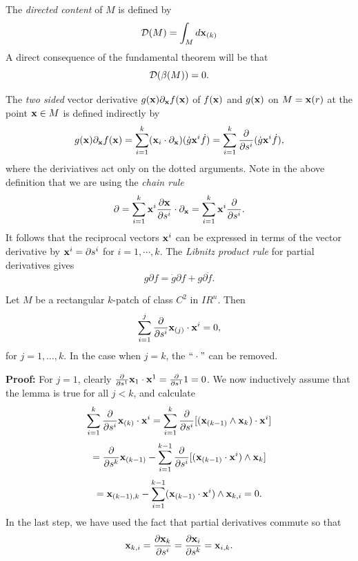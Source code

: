 \documentclass[12]{article}
\def\no{\noindent}
\def\bx{{\bf x}}
\def\R{I\!\!R}
\def\w{\wedge}
\def\no{\noindent}
\def\no{\noindent}
\def\no{\noindent}
\def\d{\partial}
\def \xx {{\bf x}}
\begin{document}
\bigskip

The {\it directed content} of $M$ is defined by
\begin{displaymath}
{\cal D}(M)=\int_{M}d\xx_{(k)}
\end{displaymath}
A direct consequence of the fundamental theorem will be that
\begin{displaymath}
{\cal D}(\beta(M))=0.
\end{displaymath}

The {\it two sided} vector derivative $g(\bx)\d_\bx f(\bx)$  of $f(\bx)$ and $g(\bx)$ on $M=\bx(r)$
 at the point $\bx\in M$ is defined indirectly by
\begin{equation}
g(\bx)\d_\bx f(\bx) 
=\sum_{i=1}^k(\xx_i \cdot \d_\bx)(\dot g \xx^i \dot f)=\sum_{i=1}^k\frac{\partial}{\partial s^i}(\dot g \xx^i \dot f),
\end{equation}
where the deriviatives act only on the dotted arguments.
 Note in the above definition that we are using the {\it chain rule} 
  \[  \partial = \sum_{i=1}^k \xx^i \frac{\partial \bx}{\partial s^i}\cdot
    \partial_\bx = \sum_{i=1}^k \xx^i \frac{\partial}{\partial s^i}
   . \]
It follows that the reciprocal vectors $\xx^i$ can be expressed in
terms of the vector derivative by $\xx^i=\partial s^i$ for
$i=1, \cdots, k$. The {\it Libnitz product rule} for partial derivatives gives 
\begin{displaymath}
g\d f=\dot g \d f+ g \d \dot f.
\end{displaymath}

\bigskip

\no {\bf Lemma:} Let $M$ be a rectangular $k$-patch of class $C^2$ in $\R^n$. Then 
   $$\sum_{i=1}^j \frac{\partial}{\partial s^i} \xx_{(j)}\cdot \bx^i=0,$$
 for $j=1,\ldots, k$. In the case when $j=k$, the $` ` \cdot "$ can be removed. 
 
 {\bf Proof:} For $j=1$, clearly  $\frac{\partial}{\partial s^1} \bx_1 \cdot \bx^1=
 \frac{\partial}{\partial s^1} 1=0$. 
 We now inductively assume that the lemma is true for all $j<k$, and calculate
   \[ \sum_{i=1}^k \frac{\partial}{\partial s^i} \xx_{(k)}\cdot \bx^i = 
    \sum_{i=1}^k \frac{\partial}{\partial s^i} [(\xx_{(k-1)}\w \bx_k)\cdot \bx^i] \]
    \[ = \frac{\partial}{\partial s^k}\bx_{(k-1)}-
    \sum_{i=1}^{k-1}\frac{\partial}{\partial s^i}[(\bx_{(k-1)}\cdot \bx^i)\w \bx_k] \] 
    \[ = \bx_{(k-1),k} -  \sum_{i=1}^{k-1}(\bx_{(k-1)}\cdot \bx^i)\w \bx_{k,i} 
               =0. \] 
  In the last step, we have used the fact that partial derivatives commute so that 
  \[ \bx_{k,i}=\frac{\partial \bx_k}{\partial s^i} = \frac{\partial \bx_i}{\partial s^k} = \bx_{i,k} . \] 
  
\end{document}
